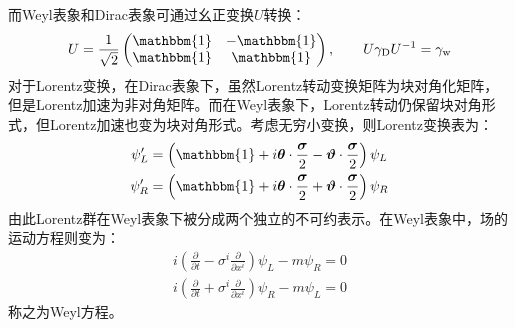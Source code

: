 而Weyl表象和Dirac表象可通过幺正变换$U$转换：
\begin{equation}
U=\frac{1}{\sqrt{2}}\begin{pmatrix}
\mathbbm{1}&	-\mathbbm{1}\\
\mathbbm{1}&	\mathbbm{1}
\end{pmatrix},\qquad U\gamma_{\text{D}} U^{-1}=\gamma_{\text{w}}
\end{equation}
对于Lorentz变换，在Dirac表象下，虽然Lorentz转动变换矩阵为块对角化矩阵，但是Lorentz加速为非对角矩阵。而在Weyl表象下，Lorentz转动仍保留块对角形式，但Lorentz加速也变为块对角形式。考虑无穷小变换，则Lorentz变换表为：
\begin{equation}
	\begin{split}
\psi_L'&=\left(\mathbbm{1}+i\boldsymbol{\theta}\cdot\frac{\boldsymbol{\sigma}}{2}-\boldsymbol{\vartheta}\cdot\frac{\boldsymbol{\sigma}}{2}\right)\psi_L\\
\psi_R'&=\left(\mathbbm{1}+i\boldsymbol{\theta}\cdot\frac{\boldsymbol{\sigma}}{2}+\boldsymbol{\vartheta}\cdot\frac{\boldsymbol{\sigma}}{2}\right)\psi_R
	\end{split}
\end{equation}
由此Lorentz群在Weyl表象下被分成两个独立的不可约表示。在Weyl表象中，场的运动方程则变为：
\begin{equation}
\begin{split}
i\left(\frac{\partial}{\partial t}-\sigma^i\frac{\partial}{\partial x^i}\right)\psi_L-m\psi_R=0\\
i\left(\frac{\partial}{\partial t}+\sigma^i\frac{\partial}{\partial x^i}\right)\psi_R-m\psi_L=0
\end{split}
\end{equation}
称之为Weyl方程。
